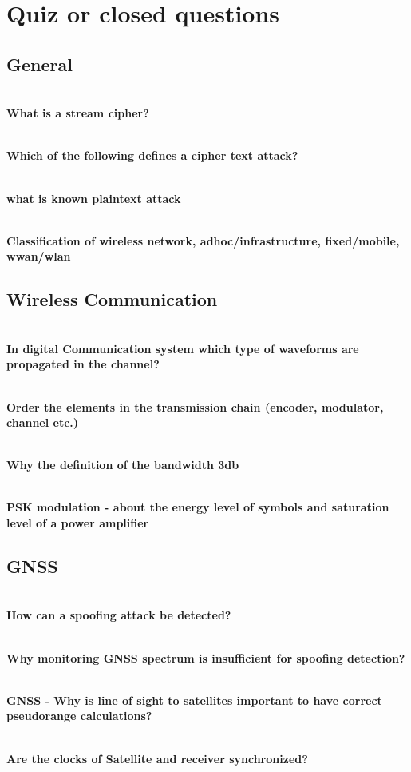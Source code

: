 \section{Quiz or closed questions}
\subsection{General}
\textbf{\\What is a stream cipher?}

\textbf{\\Which of the following defines a cipher text attack?}

\textbf{\\what is known plaintext attack}

\textbf{\\Classification of wireless network, adhoc/infrastructure, fixed/mobile, wwan/wlan}

\subsection*{Wireless Communication}

\textbf{\\In digital Communication system which type of waveforms are propagated in the channel?}

\textbf{\\Order the elements in the transmission chain (encoder, modulator, channel etc.)}

\textbf{\\Why the definition of the bandwidth 3db}

\textbf{\\PSK modulation - about the energy level of symbols and saturation level of a power amplifier}


\subsection{GNSS}
\textbf{\\How can a spoofing attack be detected?}

\textbf{\\Why monitoring GNSS spectrum is insufficient for spoofing detection?}

\textbf{\\GNSS - Why is line of sight to satellites important to have correct pseudorange calculations?}

\textbf{\\Are the clocks of Satellite and receiver synchronized?}

